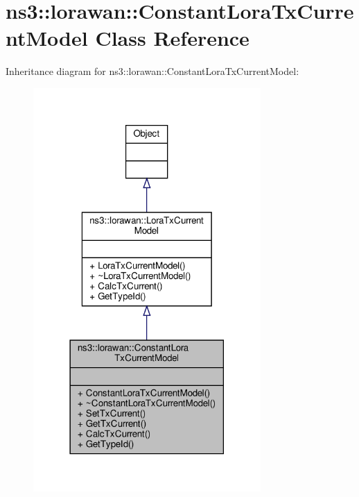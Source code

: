 \hypertarget{classns3_1_1lorawan_1_1ConstantLoraTxCurrentModel}{}\section{ns3\+:\+:lorawan\+:\+:Constant\+Lora\+Tx\+Current\+Model Class Reference}
\label{classns3_1_1lorawan_1_1ConstantLoraTxCurrentModel}


Inheritance diagram for ns3\+:\+:lorawan\+:\+:Constant\+Lora\+Tx\+Current\+Model\+:
\nopagebreak
\begin{figure}[H]
\begin{center}
\leavevmode
\includegraphics[width=246pt]{classns3_1_1lorawan_1_1ConstantLoraTxCurrentModel__inherit__graph}
\end{center}
\end{figure}


